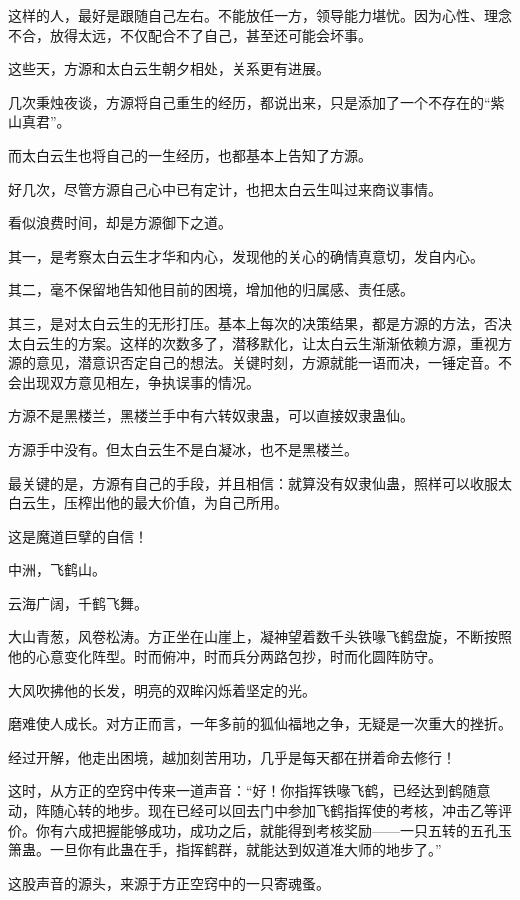 \begin{this_body}
这样的人，最好是跟随自己左右。不能放任一方，领导能力堪忧。因为心性、理念不合，放得太远，不仅配合不了自己，甚至还可能会坏事。

这些天，方源和太白云生朝夕相处，关系更有进展。

几次秉烛夜谈，方源将自己重生的经历，都说出来，只是添加了一个不存在的“紫山真君”。

而太白云生也将自己的一生经历，也都基本上告知了方源。

好几次，尽管方源自己心中已有定计，也把太白云生叫过来商议事情。

看似浪费时间，却是方源御下之道。

其一，是考察太白云生才华和内心，发现他的关心的确情真意切，发自内心。

其二，毫不保留地告知他目前的困境，增加他的归属感、责任感。

其三，是对太白云生的无形打压。基本上每次的决策结果，都是方源的方法，否决太白云生的方案。这样的次数多了，潜移默化，让太白云生渐渐依赖方源，重视方源的意见，潜意识否定自己的想法。关键时刻，方源就能一语而决，一锤定音。不会出现双方意见相左，争执误事的情况。

方源不是黑楼兰，黑楼兰手中有六转奴隶蛊，可以直接奴隶蛊仙。

方源手中没有。但太白云生不是白凝冰，也不是黑楼兰。

最关键的是，方源有自己的手段，并且相信：就算没有奴隶仙蛊，照样可以收服太白云生，压榨出他的最大价值，为自己所用。

这是魔道巨擘的自信！

中洲，飞鹤山。

云海广阔，千鹤飞舞。

大山青葱，风卷松涛。方正坐在山崖上，凝神望着数千头铁喙飞鹤盘旋，不断按照他的心意变化阵型。时而俯冲，时而兵分两路包抄，时而化圆阵防守。

大风吹拂他的长发，明亮的双眸闪烁着坚定的光。

磨难使人成长。对方正而言，一年多前的狐仙福地之争，无疑是一次重大的挫折。

经过开解，他走出困境，越加刻苦用功，几乎是每天都在拼着命去修行！

这时，从方正的空窍中传来一道声音：“好！你指挥铁喙飞鹤，已经达到鹤随意动，阵随心转的地步。现在已经可以回去门中参加飞鹤指挥使的考核，冲击乙等评价。你有六成把握能够成功，成功之后，就能得到考核奖励——一只五转的五孔玉箫蛊。一旦你有此蛊在手，指挥鹤群，就能达到奴道准大师的地步了。”

这股声音的源头，来源于方正空窍中的一只寄魂蚤。


\end{this_body}
